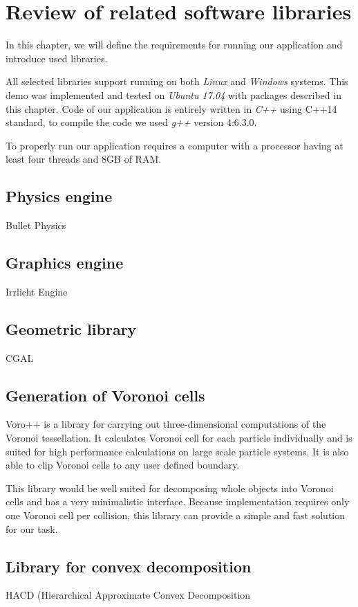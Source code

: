 \chapter{Review of related software libraries}
\label{chapt:technology}
In this chapter, we will define the requirements for running our application and introduce used libraries.

All selected libraries support running on both \emph{Linux} and \emph{Windows} systems. This demo was implemented and tested on \emph{Ubuntu 17.04} with packages described in this chapter. Code of our application is entirely written in \emph{C++} using C++14 standard, to compile the code we used \emph{g++} version 4:6.3.0.

To properly run our application requires a computer with a processor having at least four threads and 8GB of RAM.

\section{Physics engine}
Bullet Physics


\section{Graphics engine}
Irrlicht Engine

\section{Geometric library}
CGAL

\section{Generation of Voronoi cells}
Voro++ is a library for carrying out three-dimensional computations of the Voronoi tessellation. It calculates Voronoi cell for each particle individually and is suited for high performance calculations on large scale particle systems. It is also able to clip Voronoi cells to any user defined boundary.

This library would be well suited for decomposing whole objects into Voronoi cells and has a very minimalistic interface. Because implementation requires only one Voronoi cell per collision, this library can provide a simple and fast solution for our task.

\section{Library for convex decomposition}
HACD (Hierarchical Approximate Convex Decomposition
\cite{HACD}





